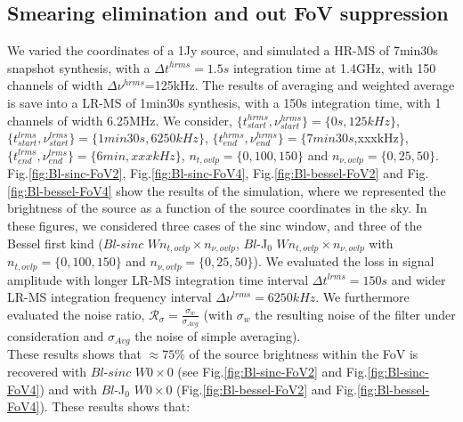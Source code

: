 \documentclass[useAMS,usenatbib]{mn2e}
\begin{document}
\subsection{Smearing elimination and out FoV suppression}
We varied the coordinates of a 1Jy source, and simulated a HR-MS of 7min30s snapshot synthesis, with a $\Delta t^{hrms}=1.5s$ integration 
time at 1.4GHz,  with 150 channels of width $\Delta \nu^{hrms}$=125kHz. The results of averaging and weighted average is save into a LR-MS 
of 1min30s synthesis, with a 150s integration time,  with 1 channels of width 6.25MHz. We consider, 
$\{t^{hrms}_{start},\nu^{hrms}_{start}\}=\{0s,125kHz\}$, $\{t^{lrms}_{start},\nu^{lrms}_{start}\}=\{1min30s,6250kHz\}$, 
$\{t^{hrms}_{end},\nu^{hrms}_{end}\}=\{7min30s$,xxxkHz\}, $\{t^{lrms}_{end},\nu^{lrms}_{end}\}=\{6min,xxxkHz\}$, $n_{t,ovlp}=\{0,100,150\}$ 
and $n_{\nu,ovlp}=\{0,25,50\}$.\\
Fig.\ref{fig:Bl-sinc-FoV2}, Fig.\ref{fig:Bl-sinc-FoV4}, Fig.\ref{fig:Bl-bessel-FoV2} and Fig.\ref{fig:Bl-bessel-FoV4} show the results of 
the simulation, where we represented the brightness of the source as a function of the source coordinates in the sky. In these figures, we 
considered three cases of the sinc window, and three of the Bessel first kind ($Bl$-$sinc$ $W n_{t,ovlp} \times n_{\nu,ovlp}$, $Bl$-J$_0$ 
$W n_{t,ovlp} \times n_{\nu,ovlp}$ with  $n_{t,ovlp}=\{0,100,150\}$ and $n_{\nu,ovlp}=\{0,25,50\}$). We evaluated the loss in signal 
amplitude with longer LR-MS integration time interval $\Delta t^{lrms}=150s$ and wider LR-MS integration frequency interval $\Delta 
\nu^{lrms}=6250kHz$. We furthermore evaluated the  noise ratio, $\mathcal{R}_{\sigma}=\frac{\sigma_{w}}{\sigma_{Avg}}$ (with $\sigma_{w}$  
the resulting noise of the filter under consideration and $\sigma_{Avg}$ the noise of simple averaging).\\
These results shows that $\approx 75\%$  of the source brightness within the FoV is recovered with $Bl$-$sinc$ $W0 
\times 0$ (see Fig.\ref{fig:Bl-sinc-FoV2} and Fig.\ref{fig:Bl-sinc-FoV4}) and with $Bl$-J$_0$ $W0\times0$ (Fig.\ref{fig:Bl-bessel-FoV2} and 
Fig.\ref{fig:Bl-bessel-FoV4}). These results shows that:
\end{document}

